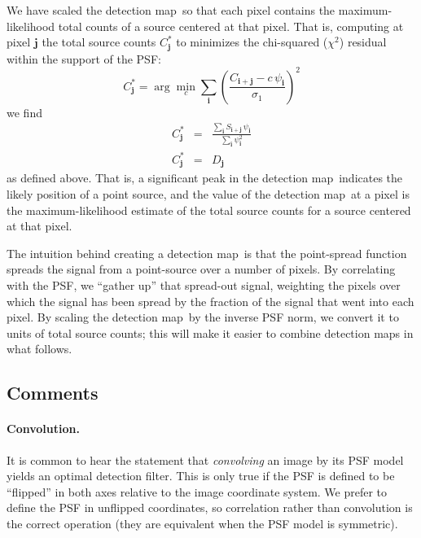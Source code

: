 \documentclass[letterpaper,preprint]{aastex}
\newcommand{\detmap}{detection map}
\newcommand{\snr}[1]{\mathbb{SN}(#1)}
\newcommand{\norm}[1]{\left\lVert #1 \right\rVert}
\renewcommand{\vec}[1]{\boldsymbol{#1}}
\newcommand{\ivec}{\vec{i}}
\newcommand{\jvec}{\vec{j}}
\newcommand{\kvec}{\vec{k}}
\begin{document}
We have scaled the \detmap\ so that each pixel contains the
maximum-likelihood total counts of a source centered at that pixel.
That is, computing at pixel $\jvec$ the total source counts
$C^{\ast}_{\jvec}$ to minimizes the chi-squared ($\chi^2$) residual
within the support of the PSF:
\begin{equation}
  C^{\ast}_{\jvec} = \arg\min_{c} \sum_{\ivec} \left( \frac{C_{\ivec+\jvec} - c \, \psi_{\ivec}}{\sigma_1} \right)^2
\end{equation}
we find
\begin{eqnarray}
  C^{\ast}_{\jvec} &=& \frac{\sum_{\ivec} S_{\ivec+\jvec} \, \psi_{\ivec}}{\sum_{\ivec} \psi_{\ivec}^2}
  \\
  C^{\ast}_{\jvec} &=& D_{\jvec} %
\end{eqnarray}
as defined above.
%
That is, a significant peak in the \detmap\ indicates the likely
position of a point source, and the value of the \detmap\ at a pixel
is the maximum-likelihood estimate of the total source counts for a
source centered at that pixel.


The intuition behind creating a \detmap\ is that the point-spread
function spreads the signal from a point-source over a number of
pixels.  By correlating with the PSF, we ``gather up'' that spread-out
signal, weighting the pixels over which the signal has been spread by
the fraction of the signal that went into each pixel.  By scaling the
\detmap\ by the inverse PSF norm, we convert it to units of total
source counts; this will make it easier to combine \detmap s in what
follows.



\subsection{Comments}

\paragraph{Convolution.}  It is common to hear the statement
that \emph{convolving} an image by its PSF model yields an optimal
detection filter.  This is only true if the PSF is defined to be
``flipped'' in both axes relative to the image coordinate system.  We
prefer to define the PSF in unflipped coordinates, so correlation
rather than convolution is the correct operation (they are equivalent
when the PSF model is symmetric).
\end{document}

